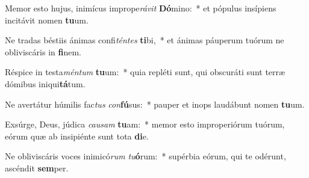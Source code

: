 \item Memor esto hujus, inimícus imprope\textit{rá}\textit{vit} \textbf{Dó}mino:~* et pópulus insípiens incitávit nomen \textbf{tu}um.
\item Ne tradas béstiis ánimas confi\textit{tén}\textit{tes} \textbf{ti}bi,~* et ánimas páuperum tuórum ne obliviscáris in \textbf{fi}nem.
\item Réspice in testa\textit{mén}\textit{tum} \textbf{tu}um:~* quia repléti sunt, qui obscuráti sunt terræ dómibus iniqui\textbf{tá}tum.
\item Ne avertátur húmilis fac\textit{tus} \textit{con}\textbf{fú}sus:~* pauper et inops laudábunt nomen \textbf{tu}um.
\item Exsúrge, Deus, júdica \textit{cau}\textit{sam} \textbf{tu}am:~* memor esto improperiórum tuórum, eórum quæ ab insipiénte sunt tota \textbf{di}e.
\item Ne obliviscáris voces inimicó\textit{rum} \textit{tu}\textbf{ó}rum:~* supérbia eórum, qui te odérunt, ascéndit \textbf{sem}per.
